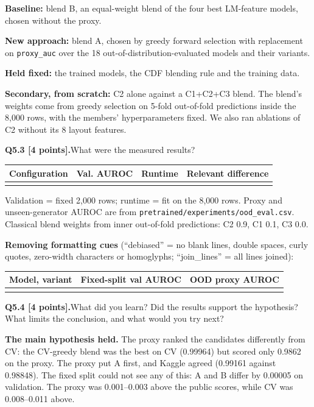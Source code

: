 \documentclass[11pt,letterpaper]{article}
\newcommand{\question}[2]{\needspace{4\baselineskip}\par\addvspace{0.45em}\noindent\textbf{#1}\quad #2\par\nobreak\vspace{0.1em}}
\newcommand{\smallnote}[1]{{\small\color{muted}#1}}
\begin{document}
\textbf{Baseline:} blend B, an equal-weight blend of the four best LM-feature models, chosen without the proxy.

\textbf{New approach:} blend A, chosen by greedy forward selection with replacement \cite{caruana2004} on \texttt{proxy\_auc} over the 18 out-of-distribution-evaluated models and their variants.

\textbf{Held fixed:} the trained models, the CDF blending rule and the training data.

\textbf{Secondary, from scratch:} C2 alone against a C1+C2+C3 blend. The blend's weights come from greedy selection on 5-fold out-of-fold predictions inside the 8,000 rows, with the members' hyperparameters fixed. We also ran ablations of C2 without its 8 layout features.

\question{Q5.3 [4 points].}{What were the measured results?}
{\small\begin{tabularx}{\linewidth}{@{}YrrY@{}}\toprule Configuration & Val. AUROC & Runtime & Relevant difference \\ \midrule
{}
\midrule
{}
\bottomrule\end{tabularx}}
\smallnote{Validation = fixed 2,000 rows; runtime = fit on the 8,000 rows. Proxy and unseen-generator AUROC are from \texttt{pretrained/experiments/ood\_eval.csv}. Classical blend weights from inner out-of-fold predictions: C2 0.9, C1 0.1, C3 0.0.}

\textbf{Removing formatting cues} (``debiased'' = no blank lines, double spaces, curly quotes, zero-width characters or homoglyphs; ``join\_lines'' = all lines joined):

{\small\begin{tabularx}{\linewidth}{@{}Yrr@{}}\toprule Model, variant & Fixed-split val AUROC & OOD proxy AUROC \\ \midrule
{}
\bottomrule\end{tabularx}}

\question{Q5.4 [4 points].}{What did you learn? Did the results support the hypothesis? What limits the conclusion, and what would you try next?}
\textbf{The main hypothesis held.} The proxy ranked the candidates differently from CV: the CV-greedy blend was the best on CV (0.99964) but scored only 0.9862 on the proxy. The proxy put A first, and Kaggle agreed (0.99161 against 0.98848). The fixed split could not see any of this: A and B differ by 0.00005 on validation. The proxy was 0.001--0.003 above the public scores, while CV was 0.008--0.011 above.
\end{document}
